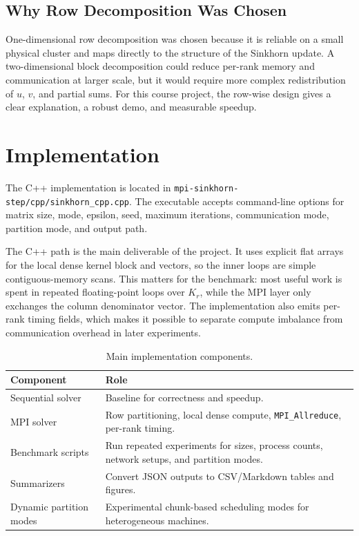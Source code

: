 \documentclass[12pt,a4paper]{article}
\begin{document}
\subsection{Why Row Decomposition Was Chosen}

One-dimensional row decomposition was chosen because it is reliable on a small physical cluster and maps directly to the structure of the Sinkhorn update. A two-dimensional block decomposition could reduce per-rank memory and communication at larger scale, but it would require more complex redistribution of $u$, $v$, and partial sums. For this course project, the row-wise design gives a clear explanation, a robust demo, and measurable speedup.

\section{Implementation}

The C++ implementation is located in \texttt{mpi-sinkhorn-step/cpp/sinkhorn\_cpp.cpp}. The executable accepts command-line options for matrix size, mode, epsilon, seed, maximum iterations, communication mode, partition mode, and output path.

The C++ path is the main deliverable of the project. It uses explicit flat arrays for the local dense kernel block and vectors, so the inner loops are simple contiguous-memory scans. This matters for the benchmark: most useful work is spent in repeated floating-point loops over $K_r$, while the MPI layer only exchanges the column denominator vector. The implementation also emits per-rank timing fields, which makes it possible to separate compute imbalance from communication overhead in later experiments.

\begin{table}[H]
\centering
\begin{tabularx}{\linewidth}{P{4cm}Y}
\toprule
\textbf{Component} & \textbf{Role} \\
\midrule
Sequential solver & Baseline for correctness and speedup. \\
MPI solver & Row partitioning, local dense compute, \texttt{MPI\_Allreduce}, per-rank timing. \\
Benchmark scripts & Run repeated experiments for sizes, process counts, network setups, and partition modes. \\
Summarizers & Convert JSON outputs to CSV/Markdown tables and figures. \\
Dynamic partition modes & Experimental chunk-based scheduling modes for heterogeneous machines. \\
\bottomrule
\end{tabularx}
\caption{Main implementation components.}
\end{table}
\end{document}
